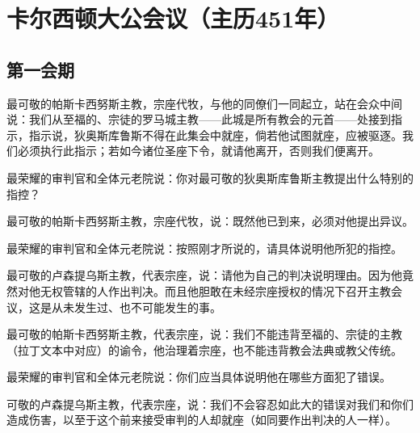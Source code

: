 
\chapter{卡尔西顿大公会议（主历451年）}


\par


\section{第一会期}

最可敬的帕斯卡西努斯主教，宗座代牧，与他的同僚们一同起立，站在会众中间说：我们从至福的、宗徒的罗马城主教——此城是所有教会的元首——处接到指示，指示说，狄奥斯库鲁斯不得在此集会中就座，倘若他试图就座，应被驱逐。我们必须执行此指示；若如今诸位圣座下令，就请他离开，否则我们便离开。\par

最荣耀的审判官和全体元老院说：你对最可敬的狄奥斯库鲁斯主教提出什么特别的指控？\par

最可敬的帕斯卡西努斯主教，宗座代牧，说：既然他已到来，必须对他提出异议。\par

最荣耀的审判官和全体元老院说：按照刚才所说的，请具体说明他所犯的指控。\par

最可敬的卢森提乌斯主教，代表宗座，说：请他为自己的判决说明理由。因为他竟然对他无权管辖的人作出判决。而且他胆敢在未经宗座授权的情况下召开主教会议，这是从未发生过、也不可能发生的事。\par

最可敬的帕斯卡西努斯主教，代表宗座，说：我们不能违背至福的、宗徒的主教（拉丁文本中对应）的谕令，他治理着宗座，也不能违背教会法典或教父传统。\par

最荣耀的审判官和全体元老院说：你们应当具体说明他在哪些方面犯了错误。\par

可敬的卢森提乌斯主教，代表宗座，说：我们不会容忍如此大的错误对我们和你们造成伤害，以至于这个前来接受审判的人却就座（如同要作出判决的人一样）。\par

